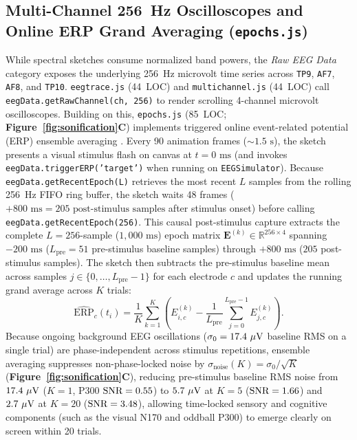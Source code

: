 \documentclass[10pt,twocolumn]{article}
\begin{document}
\subsection{Multi-Channel 256~Hz Oscilloscopes and Online ERP Grand Averaging (\texttt{epochs.js})}
While spectral sketches consume normalized band powers, the \emph{Raw EEG Data} category exposes the underlying 256~Hz microvolt time series across \texttt{TP9}, \texttt{AF7}, \texttt{AF8}, and \texttt{TP10}. \texttt{eegtrace.js} (44~LOC) and \texttt{multichannel.js} (44~LOC) call \texttt{eegData.getRawChannel(ch, 256)} to render scrolling 4-channel microvolt oscilloscopes. Building on this, \texttt{epochs.js} (85~LOC; \textbf{Figure~\ref{fig:sonification}C}) implements triggered online event-related potential (ERP) ensemble averaging \citep{luck2014introduction,krigolson2017choosing}. Every 90 animation frames ($\sim 1.5\text{ s}$), the sketch presents a visual stimulus flash on canvas at $t = 0\text{ ms}$ (and invokes \texttt{eegData.triggerERP('target')} when running on \texttt{EEGSimulator}). Because \texttt{eegData.getRecentEpoch(L)} retrieves the most recent $L$ samples from the rolling 256~Hz FIFO ring buffer, the sketch waits 48 frames ($+800\text{ ms} = 205\text{ post-stimulus samples}$ after stimulus onset) before calling \texttt{eegData.getRecentEpoch(256)}. This causal post-stimulus capture extracts the complete $L = 256$-sample ($1,000\text{ ms}$) epoch matrix $\mathbf{E}^{(k)} \in \mathbb{R}^{256 \times 4}$ spanning $-200\text{ ms}$ ($L_{\text{pre}} = 51$ pre-stimulus baseline samples) through $+800\text{ ms}$ ($205$ post-stimulus samples). The sketch then subtracts the pre-stimulus baseline mean across samples $j \in \{0, \dots, L_{\text{pre}}-1\}$ for each electrode $c$ and updates the running grand average across $K$ trials:
\begin{equation}
\widehat{\text{ERP}}_{c}(t_i) = \frac{1}{K} \sum_{k=1}^{K} \left( E^{(k)}_{i,c} - \frac{1}{L_{\text{pre}}} \sum_{j=0}^{L_{\text{pre}}-1} E^{(k)}_{j,c} \right).
\end{equation}
Because ongoing background EEG oscillations ($\sigma_0 = 17.4\ \mu\text{V}$ baseline RMS on a single trial) are phase-independent across stimulus repetitions, ensemble averaging suppresses non-phase-locked noise by $\sigma_{\text{noise}}(K) = \sigma_0 / \sqrt{K}$ (\textbf{Figure~\ref{fig:sonification}C}), reducing pre-stimulus baseline RMS noise from $17.4\ \mu\text{V}$ ($K=1$, P300 $\text{SNR} = 0.55$) to $5.7\ \mu\text{V}$ at $K=5$ ($\text{SNR} = 1.66$) and $2.7\ \mu\text{V}$ at $K=20$ ($\text{SNR} = 3.48$), allowing time-locked sensory and cognitive components (such as the visual N170 and oddball P300) to emerge clearly on screen within 20 trials.
\end{document}
